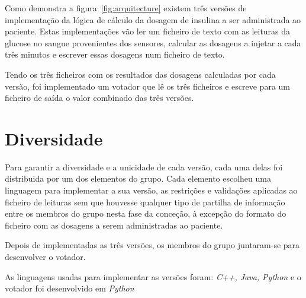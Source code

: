 Como demonstra a figura~\ref{fig:arquitecture} existem três versões de implementação da lógica de cálculo da dosagem de insulina a ser
administrada ao paciente. Estas implementações vão ler um ficheiro de texto com as leituras da glucose no sangue
provenientes dos sensores, calcular as dosagens a injetar a cada três minutos e escrever essas dosagens num ficheiro de
texto.\par
Tendo os três ficheiros com os resultados das dosagens calculadas por cada versão, foi implementado um votador que lê
os três ficheiros e escreve para um ficheiro de saída o valor combinado das três versões.

\section{Diversidade}
\label{sec:diversidade}
Para garantir a diversidade e a unicidade de cada versão, cada uma delas foi distribuida por um dos elementos do grupo.
Cada elemento escolheu uma linguagem para implementar a sua versão, as restrições e validações aplicadas ao ficheiro de
leituras sem que houvesse qualquer tipo de partilha de informação entre os membros do grupo nesta fase da conceção, à 
excepção do formato do ficheiro com as dosagens a serem administradas ao paciente.\par
Depois de implementadas as três versões, os membros do grupo juntaram-se para desenvolver o votador.\par
As linguagens usadas para implementar as versões foram: \textit{C++, Java, Python} e o votador foi desenvolvido em
\textit{Python}
